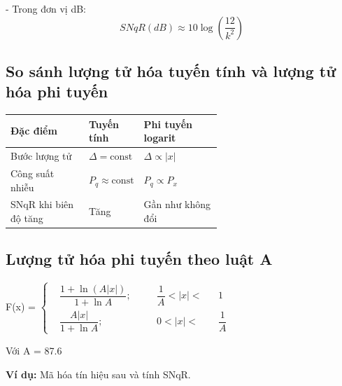 - Trong đơn vị dB:
\[
    \boxed{SNqR(dB) \approx 10 \log \left(\dfrac{12}{k^2}\right)}
\]

\subsection{So sánh lượng tử hóa tuyến tính và lượng tử hóa phi tuyến}

\begin{center}
    
\end{center}

\begingroup
    \renewcommand{\arraystretch}{1.4}
    \noindent
    \begin{tabularx}{\linewidth}{@{}
        >{\raggedright\arraybackslash}p{0.37\linewidth}
        >{\raggedright\arraybackslash}p{0.23\linewidth}
        >{\raggedright\arraybackslash}X@{}}
        \textbf{Đặc điểm} & \textbf{Tuyến tính} & \textbf{Phi tuyến logarit} \\
        \hline
        Bước lượng tử & $\Delta = \mathrm{const}$ & $\Delta \propto |x|$ \\
        \hline
        Công suất nhiễu & $P_q \approx \mathrm{const}$ & $P_q \propto P_x$ \\
        \hline
        SNqR khi biên độ tăng & Tăng & Gần như không đổi \\
    \end{tabularx}
    \par
\endgroup

\subsection{Lượng tử hóa phi tuyến theo luật A}


\begin{center}
    F(x) = 
    $
        \left\{
            \begin{aligned}
            &\dfrac{1 + \ln(A|x|)}{1 + \ln A}; \quad &&\dfrac{1}{A} < |x| < &&1\\[6pt]
            &\dfrac{A|x|}{1 + \ln A}; \quad &&0 < |x| < &&\dfrac{1}{A}
            \end{aligned}
        \right.
    $
\end{center}

Với A = 87.6

\newpage

\noindent\textbf{Ví dụ:} Mã hóa tín hiệu sau và tính SNqR.
\begin{center}
    
\end{center}

